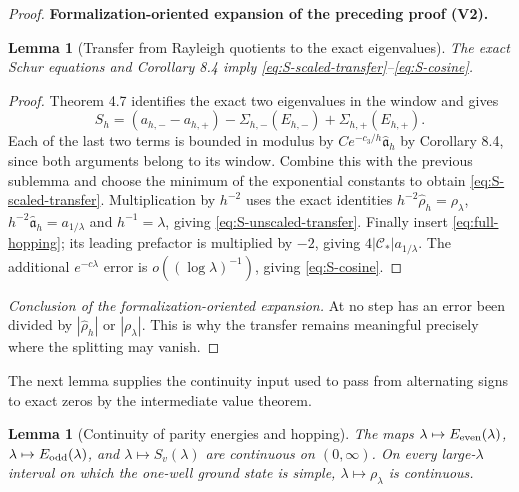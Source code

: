 \documentclass[11pt]{article}
\newtheorem{lemma}[theorem]{Lemma}
\newcommand{\formalisationparentid}{X}
\newenvironment{formalisationaddition}[1]{\par\medskip\begingroup\color{blue}\def\formalisationparentid{#1}\setcounter{formalizationsublemma}{0}\let\lemma\formalizationsublemma\let\endlemma\endformalizationsublemma
  \def\Eo{\mathcal E_h^\circ}\def\EE{\mathcal E_h}\def\phio{\phi_h^\circ}\def\phih{\phi_h}\def\Ho{H_h^{\rm atom}(v^\circ)}\def\Ha{H_h^{\rm atom}}\def\HL{H_h^{L}}\def\Dh{D_h}\def\Log{\operatorname{Log}}\def\ellh{\ell_h}\def\Gp{G_{p,h}}\def\Ast{A_{*,h}}\def\ahat{\widehat{\mathfrak a}_h}\def\ah{\mathfrak a_h}\def\rh{\widehat\rho_h}\def\deltah{\widehat\delta_h}\def\oldref##1{\textup{(##1)}}\def\interface##1{\par\noindent\textit{Analytical interface used here.} ##1\par}\def\finish{\par\noindent\textit{Conclusion of the formalization-oriented expansion.} }\par\noindent\textbf{Formalization-oriented expansion of the preceding proof (V2).}\par\smallskip
}{\par\endgroup\medskip
}
\begin{document}
\begin{proof}
\begin{formalisationaddition}{T8.5}
\begin{lemma}[Transfer from Rayleigh quotients to the exact eigenvalues]\label{sublemma:T8-5-transfer}
The exact Schur equations and Corollary 8.4 imply \eqref{eq:S-scaled-transfer}--\eqref{eq:S-cosine}.
\end{lemma}
\begin{proof}
Theorem 4.7 identifies the exact two eigenvalues in the window and gives
\[
 S_h=(a_{h,-}-a_{h,+})-\Sigma_{h,-}(E_{h,-})+\Sigma_{h,+}(E_{h,+}).
\]
Each of the last two terms is bounded in modulus by $Ce^{-c_3/h}\ahat$ by Corollary 8.4, since both arguments belong to its window. Combine this with the previous sublemma and choose the minimum of the exponential constants to obtain \eqref{eq:S-scaled-transfer}. Multiplication by $h^{-2}$ uses the exact identities $h^{-2}\rh=\rho_\lambda$, $h^{-2}\ahat=a_{1/\lambda}$ and $h^{-1}=\lambda$, giving \eqref{eq:S-unscaled-transfer}. Finally insert \eqref{eq:full-hopping}; its leading prefactor is multiplied by $-2$, giving $4|\mathscr C_*|a_{1/\lambda}$. The additional $e^{-c\lambda}$ error is $o((\log\lambda)^{-1})$, giving \eqref{eq:S-cosine}.
\end{proof}
\finish At no step has an error been divided by $|\rh|$ or $|\rho_\lambda|$. This is why the transfer remains meaningful precisely where the splitting may vanish.
\end{formalisationaddition}

\end{proof}

The next lemma supplies the continuity input used to pass from alternating
signs to exact zeros by the intermediate value theorem.

\begin{lemma}[Continuity of parity energies and hopping]
\label{lem:continuity}
The maps
$\lambda\mapsto E_{\rm even}(\lambda)$,
$\lambda\mapsto E_{\rm odd}(\lambda)$, and
$\lambda\mapsto S_v(\lambda)$ are continuous on $(0,\infty)$.  On every
large-$\lambda$ interval on which the one-well ground state is simple,
$\lambda\mapsto\rho_\lambda$ is continuous.
\end{lemma}
\end{document}
